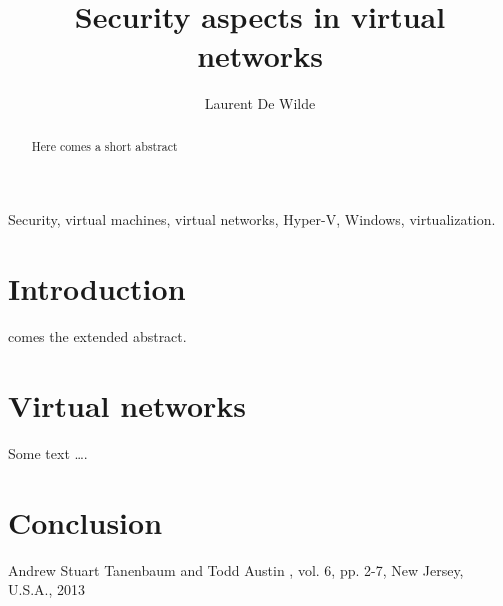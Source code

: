 \documentclass[twocolumn]{phdsymp} %
\begin{document}
\title{Security aspects in virtual networks}

\author{Laurent De Wilde}


\maketitle

\begin{abstract}
Here comes a short abstract
\end{abstract}

\begin{keywords}
Security, virtual machines, virtual networks, Hyper-V, Windows, virtualization.
\end{keywords}

\section{Introduction}
 comes the extended abstract.


\section{Virtual networks}

Some text \ldots .


\section{Conclusion}


\nocite{*}


\begin{thebibliography}{1}
Andrew Stuart Tanenbaum and Todd Austin
,
\newblock vol. 6, pp. 2-7, New Jersey, U.S.A., 2013


\end{thebibliography}
\end{document}

